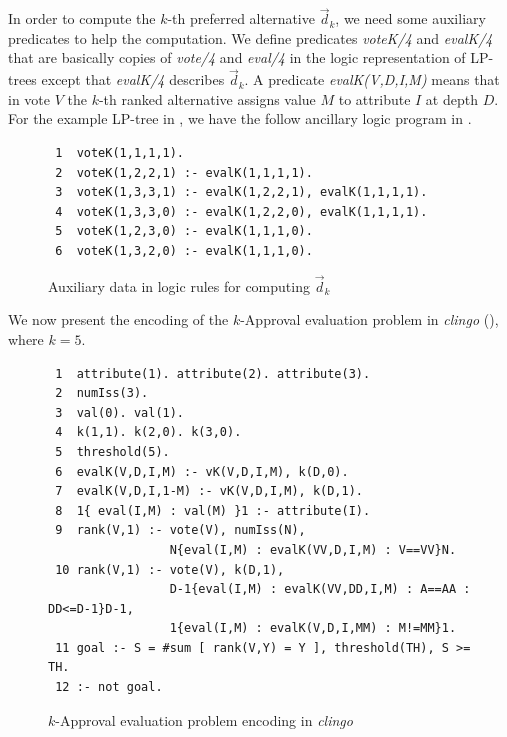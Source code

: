 In order to compute the $k$-th preferred alternative $\vec{d}_k$, we need
some auxiliary predicates to help the computation.  We define predicates
\textit{voteK/4} and \textit{evalK/4} that are basically copies 
of \textit{vote/4} and \textit{eval/4} in
the logic representation of LP-trees except that \textit{evalK/4} describes
$\vec{d}_k$.  A predicate \textit{evalK(V,D,I,M)} means that in vote $V$
the $k$-th ranked alternative assigns value $M$ to attribute $I$ at depth $D$.
For the example LP-tree in , we have the follow ancillary
logic program in .

\begin{figure}[H]
   \small
	\begin{framed}
		\begin{verbatim}
 1  voteK(1,1,1,1).
 2  voteK(1,2,2,1) :- evalK(1,1,1,1).
 3  voteK(1,3,3,1) :- evalK(1,2,2,1), evalK(1,1,1,1).
 4  voteK(1,3,3,0) :- evalK(1,2,2,0), evalK(1,1,1,1).
 5  voteK(1,2,3,0) :- evalK(1,1,1,0).
 6  voteK(1,3,2,0) :- evalK(1,1,1,0).
		\end{verbatim}
	\end{framed}
	\caption{Auxiliary data in logic rules for computing $\vec{d}_k$ }
  \label{fig:LPTreeASP_aux}
\end{figure}

We now present the encoding of the $k$-Approval evaluation problem in \emph{clingo}
(), where $k=5$.
\begin{figure}[ht]
  \centering
	\begin{framed}
	\small
		\begin{verbatim}
 1  attribute(1). attribute(2). attribute(3).
 2  numIss(3).
 3  val(0). val(1).
 4  k(1,1). k(2,0). k(3,0).
 5  threshold(5).
 6  evalK(V,D,I,M) :- vK(V,D,I,M), k(D,0).
 7  evalK(V,D,I,1-M) :- vK(V,D,I,M), k(D,1).
 8  1{ eval(I,M) : val(M) }1 :- attribute(I).
 9  rank(V,1) :- vote(V), numIss(N),
                 N{eval(I,M) : evalK(VV,D,I,M) : V==VV}N.
 10 rank(V,1) :- vote(V), k(D,1), 
                 D-1{eval(I,M) : evalK(VV,DD,I,M) : A==AA : DD<=D-1}D-1,
                 1{eval(I,M) : evalK(V,D,I,MM) : M!=MM}1.
 11 goal :- S = #sum [ rank(V,Y) = Y ], threshold(TH), S >= TH.
 12 :- not goal.
		\end{verbatim}
	\end{framed}
	\caption{$k$-Approval evaluation problem encoding in \emph{clingo}}
	\label{fig:clingo:kEval}
\end{figure}


